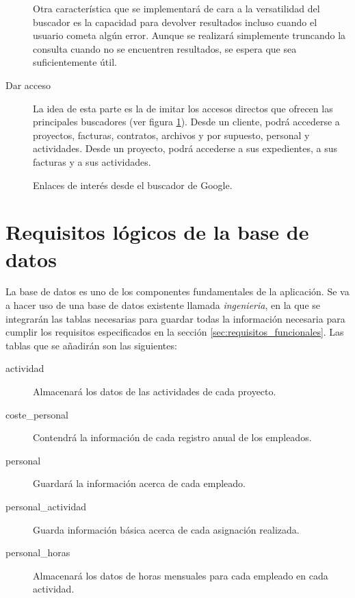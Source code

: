 \begin{description}
Otra característica que se implementará de cara a la versatilidad del
buscador es la capacidad para devolver resultados incluso cuando el usuario
cometa algún error. Aunque se realizará simplemente truncando la consulta cuando
no se encuentren resultados, se espera que sea suficientemente útil.

\item [Dar acceso] La idea de esta parte es la de imitar los accesos directos
que ofrecen las principales buscadores (ver figura \ref{fig:enlaces_buscador}).
Desde un cliente, podrá accederse a proyectos, facturas, contratos, archivos y
por supuesto, personal y actividades. Desde un proyecto, podrá accederse a sus
expedientes, a sus facturas y a sus actividades.

\end{description}

\begin{figure}
\centering
{}
\caption{Enlaces de interés desde el buscador de Google.}
\label{fig:enlaces_buscador}
\end{figure}


\section{Requisitos lógicos de la base de datos}

La base de datos es uno de los componentes fundamentales de la aplicación. Se
va a hacer uso de una base de datos existente llamada \textit{ingenieria}, en la
que se integrarán las tablas necesarias para guardar todas la información
necesaria para cumplir los requisitos especificados en la sección
\ref{sec:requisitos_funcionales}. Las tablas que se añadirán son las siguientes:

\begin{description}
\item [actividad] Almacenará los datos de las actividades de cada
proyecto.

\item [coste\_personal] Contendrá la información de cada registro anual
de los empleados.

\item [personal] Guardará la información acerca de cada empleado.

\item [personal\_actividad] Guarda información básica acerca de cada asignación
realizada.

\item [personal\_horas] Almacenará los datos de horas mensuales para cada
empleado en cada actividad.
\end{description}


